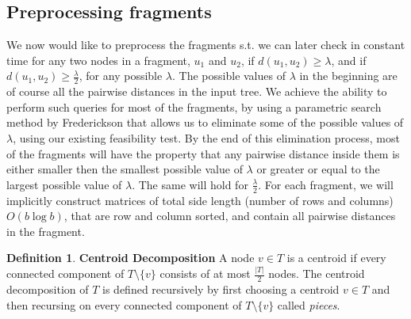 \documentclass[11pt,a4paper]{article}
\theoremstyle{definition}
\newtheorem{definition}{Definition}
\theoremstyle{remark}
\begin{document}
\subsection{Preprocessing fragments} \label{Pre-Processing Fragments}
We now would like to preprocess the fragments s.t. we can later check in constant time for any two nodes in a fragment, $u_1$ and $u_2$, if $d(u_1,u_2)\geq\lambda$, and if $d(u_1,u_2) \geq \frac{\lambda}{2}$, for any possible $\lambda$. The possible values of $\lambda$ in the beginning are of course all the pairwise distances in the input tree. We achieve the ability to perform such queries for most of the fragments, by using a parametric search method by Frederickson that allows us to eliminate some of the possible values of $\lambda$, using our existing feasibility test. By the end of this elimination process, most of the fragments will have the property that any pairwise distance inside them is either smaller then the smallest possible value of $\lambda$ or
 greater or equal to the largest possible value of $\lambda$. The same will hold for $\frac{\lambda}{2}$.
For each fragment, we will implicitly construct matrices of total side length (number of rows and columns) $O(b \log b)$, that are row and column sorted, and contain all pairwise distances in the fragment.

\begin{definition} \textbf{Centroid Decomposition}
A node $v\in T$ is a centroid if every connected component of $T\setminus\{v\}$ consists of at most $\frac{|T|}{2}$
nodes. The centroid decomposition of $T$ is defined recursively by first choosing a centroid $v\in T$
and then recursing on every connected component of $T\setminus\{v\}$ called \emph{pieces}.
\end{definition}
\end{document}
